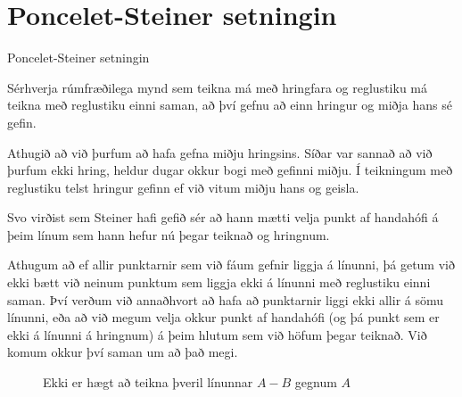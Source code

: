 \section{Poncelet-Steiner setningin}
\begin{frame}{Poncelet-Steiner setningin}
\begin{setn}
Sérhverja rúmfræðilega mynd sem teikna má með hringfara og reglustiku má teikna
með reglustiku einni saman, að því gefnu að einn hringur og miðja hans sé gefin.
\end{setn}

Athugið að við þurfum að hafa gefna miðju hringsins.
Síðar var sannað að við þurfum ekki hring, heldur dugar okkur bogi með gefinni miðju.
Í teikningum með reglustiku telst hringur gefinn ef við vitum miðju hans og
geisla.
\end{frame}

\begin{frame}
  Svo virðist sem Steiner hafi gefið sér að hann mætti velja punkt af handahófi
  á þeim línum sem hann hefur nú þegar teiknað og hringnum.
  
  Athugum að ef allir punktarnir sem við fáum gefnir liggja á línunni,
  þá getum við ekki bætt við neinum punktum sem liggja ekki á línunni með
  reglustiku einni saman. Því verðum við annaðhvort að hafa að punktarnir liggi
  ekki allir á sömu línunni, eða að við megum velja okkur punkt af handahófi
  (og þá punkt sem er ekki á línunni á hringnum) á þeim hlutum sem við höfum þegar teiknað.
  Við komum okkur því saman um að það megi.

  \begin{figure}[H]
    \centering
    
    \caption{Ekki er hægt að teikna þveril línunnar \(A-B\) gegnum \(A\)}
    \label{fig:ekkiallir}
  \end{figure}
\end{frame}


